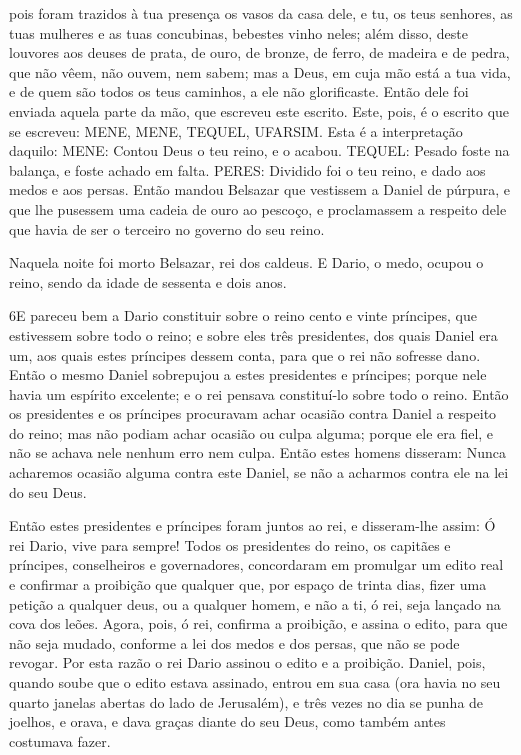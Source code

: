 pois foram trazidos à tua presença os vasos da casa dele, e tu, os
teus senhores, as tuas mulheres e as tuas concubinas, bebestes vinho
neles; além disso, deste louvores aos deuses de prata, de ouro, de
bronze, de ferro, de madeira e de pedra, que não vêem, não ouvem,
nem sabem; mas a Deus, em cuja mão está a tua vida, e de quem são
todos os teus caminhos, a ele não glorificaste. Então dele
foi enviada aquela parte da mão, que escreveu este escrito.
Este, pois, é o escrito que se escreveu: MENE, MENE, TEQUEL,
UFARSIM. Esta é a interpretação daquilo: MENE: Contou Deus o
teu reino, e o acabou. TEQUEL: Pesado foste na balança, e
foste achado em falta. PERES: Dividido foi o teu reino, e
dado aos medos e aos persas. Então mandou Belsazar que
vestissem a Daniel de púrpura, e que lhe pusessem uma cadeia de ouro
ao pescoço, e proclamassem a respeito dele que havia de ser o
terceiro no governo do seu reino.

Naquela noite foi morto Belsazar, rei dos caldeus. E
Dario, o medo, ocupou o reino, sendo da idade de sessenta e dois
anos.

\medskip

\lettrine{6} E pareceu bem a Dario constituir sobre o reino
cento e vinte príncipes, que estivessem sobre todo o reino; e
sobre eles três presidentes, dos quais Daniel era um, aos quais
estes príncipes dessem conta, para que o rei não sofresse dano.
Então o mesmo Daniel sobrepujou a estes presidentes e príncipes;
porque nele havia um espírito excelente; e o rei pensava
constituí-lo sobre todo o reino. Então os presidentes e os
príncipes procuravam achar ocasião contra Daniel a respeito do
reino; mas não podiam achar ocasião ou culpa alguma; porque ele era
fiel, e não se achava nele nenhum erro nem culpa. Então estes
homens disseram: Nunca acharemos ocasião alguma contra este Daniel,
se não a acharmos contra ele na lei do seu Deus.

Então estes presidentes e príncipes foram juntos ao rei, e
disseram-lhe assim: Ó rei Dario, vive para sempre! Todos os
presidentes do reino, os capitães e príncipes, conselheiros e
governadores, concordaram em promulgar um edito real e confirmar a
proibição que qualquer que, por espaço de trinta dias, fizer uma
petição a qualquer deus, ou a qualquer homem, e não a ti, ó rei,
seja lançado na cova dos leões. Agora, pois, ó rei, confirma a
proibição, e assina o edito, para que não seja mudado, conforme a
lei dos medos e dos persas, que não se pode revogar. Por esta
razão o rei Dario assinou o edito e a proibição. Daniel,
pois, quando soube que o edito estava assinado, entrou em sua casa
(ora havia no seu quarto janelas abertas do lado de Jerusalém), e
três vezes no dia se punha de joelhos, e orava, e dava graças diante
do seu Deus, como também antes costumava fazer.

